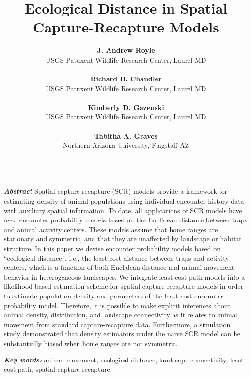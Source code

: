 \documentclass[12pt]{article}
\title{Ecological Distance in Spatial Capture-Recapture Models}
\author{
{\bf J. Andrew Royle}\\
USGS Patuxent Wildlife Research Center, Laurel MD \\ \\
{\bf Richard B. Chandler} \\
USGS Patuxent Wildlife Research Center, Laurel MD\\ \\
{\bf Kimberly D. Gazenski} \\
USGS Patuxent Wildlife Research Center, Laurel MD\\ \\
{\bf Tabitha A. Graves} \\
Northern Arizona University, Flagstaff AZ \\ \\
}
\begin{document}
\maketitle

\date

\newpage

\linenumbers

\begin{flushleft}
{\em \bf Abstract}
Spatial capture-recapture (SCR) models provide a framework for
estimating density of animal populations using individual encounter
history data with auxiliary spatial information.  To date, all
applications of SCR models have used encounter probability models
based on the Euclidean distance between traps and animal activity
centers. These models assume that home ranges are stationary and
symmetric, and that they are unaffected by landscape or habitat
structure. In this paper we devise encounter probability models based
on ``ecological distance'', i.e., the least-cost distance between
traps and activity centers, which is a function of both Euclidean
distance and animal movement behavior in heterogeneous landscapes. We
integrate least-cost path models into a likelihood-based estimation
scheme for spatial capture-recapture models in order to estimate
population density and parameters of the least-cost encounter
probability model.  Therefore, it is possible to make explicit
inferences about animal density, distribution, and landscape
connectivity as it relates to animal movement from standard
capture-recapture data.  Furthermore, a simulation study demonstrated
that density estimators under the naive SCR model can be substantially
biased when home ranges are not symmetric.

{\em \bf Key words:} animal movement, ecological distance, landscape connectivity,
least-cost path, spatial capture-recapture



\end{flushleft}
\end{document}

